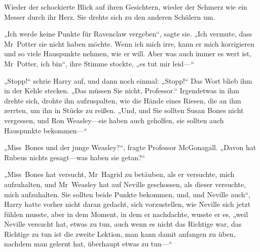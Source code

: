 
Wieder der schockierte Blick auf ihren Gesichtern, wieder der Schmerz wie ein Messer durch ihr Herz.
Sie drehte sich zu den anderen Schülern um.

„Ich werde keine Punkte für Ravenclaw vergeben“, sagte sie. „Ich vermute, dass Mr~Potter sie nicht haben möchte. Wenn ich mich irre, kann er mich korrigieren und so viele Hauspunkte nehmen, wie er will. Aber was auch immer es wert ist, Mr~Potter, ich bin“, ihre Stimme stockte, „es tut mir leid—“

\later

„Stopp!“ schrie Harry auf, und dann noch einmal: „Stopp!“
Das Wort blieb ihm in der Kehle stecken.
„Das müssen Sie nicht, Professor.“
Irgendetwas in ihm drehte sich, drohte ihn aufzuspalten, wie die Hände eines Riesen, die an ihm zerrten, um ihn in Stücke zu reißen.
„Und, und Sie sollten Susan Bones nicht vergessen, und Ron Weasley—sie haben auch geholfen, sie sollten auch Hauspunkte bekommen—“

„Miss~Bones und der junge Weasley?“, fragte Professor McGonagall.
„Davon hat Rubeus nichts gesagt—was haben sie getan?“

„Miss~Bones hat versucht, Mr~Hagrid zu betäuben, als er versuchte, mich aufzuhalten, und Mr~Weasley hat auf Neville geschossen, als dieser versuchte, mich aufzuhalten. Sie sollten beide Punkte bekommen, und, und Neville auch“, Harry hatte vorher nicht daran gedacht, sich vorzustellen, wie Neville sich jetzt fühlen musste, aber in dem Moment, in dem er nachdachte, wusste er es, „weil Neville versucht hat, etwas zu tun, auch wenn es nicht das Richtige war, das Richtige zu tun ist die zweite Lektion, man kann damit anfangen zu üben, nachdem man gelernt hat, überhaupt etwas zu tun—“

